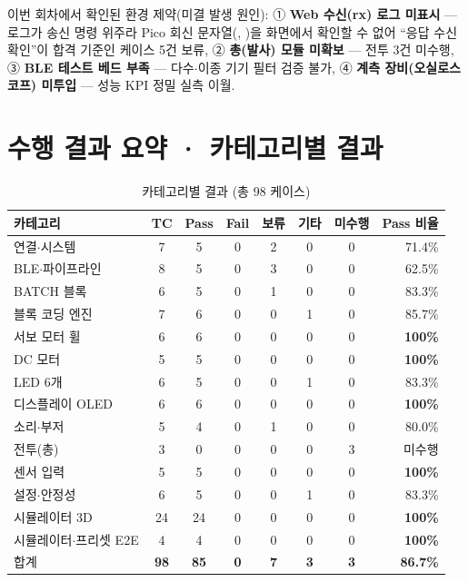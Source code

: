 이번 회차에서 확인된 환경 제약(미결 발생 원인): ① \textbf{Web 수신(rx) 로그 미표시} ---
로그가 송신 명령 위주라 Pico 회신 문자열(, )을 화면에서 확인할 수 없어
``응답 수신 확인''이 합격 기준인 케이스 5건 보류, ② \textbf{총(발사) 모듈 미확보} ---
전투 3건 미수행, ③ \textbf{BLE 테스트 베드 부족} --- 다수$\cdot$이종 기기 필터 검증 불가,
④ \textbf{계측 장비(오실로스코프) 미투입} --- 성능 KPI 정밀 실측 이월.

\section{수행 결과 요약 · 카테고리별 결과}
\begin{table}[htbp]\centering\small
\caption{카테고리별 결과 (총 98 케이스)}
\renewcommand{\arraystretch}{1.18}
\begin{tabularx}{\linewidth}{@{}X c c c c c c r@{}}
\toprule
\sffamily 카테고리 & \sffamily TC & \sffamily Pass & \sffamily Fail & \sffamily 보류 & \sffamily 기타 & \sffamily 미수행 & \sffamily Pass 비율 \\
\midrule
연결$\cdot$시스템        & 7  & 5  & 0 & 2 & 0 & 0 & 71.4\% \\
BLE$\cdot$파이프라인     & 8  & 5  & 0 & 3 & 0 & 0 & 62.5\% \\
BATCH 블록              & 6  & 5  & 0 & 1 & 0 & 0 & 83.3\% \\
블록 코딩 엔진           & 7  & 6  & 0 & 0 & 1 & 0 & 85.7\% \\
서보 모터 휠             & 6  & 6  & 0 & 0 & 0 & 0 & \textbf{100\%} \\
DC 모터                 & 5  & 5  & 0 & 0 & 0 & 0 & \textbf{100\%} \\
LED 6개                 & 6  & 5  & 0 & 0 & 1 & 0 & 83.3\% \\
디스플레이 OLED          & 6  & 6  & 0 & 0 & 0 & 0 & \textbf{100\%} \\
소리$\cdot$부저          & 5  & 4  & 0 & 1 & 0 & 0 & 80.0\% \\
전투(총)                & 3  & 0  & 0 & 0 & 0 & 3 & 미수행 \\
센서 입력               & 5  & 5  & 0 & 0 & 0 & 0 & \textbf{100\%} \\
설정$\cdot$안정성        & 6  & 5  & 0 & 0 & 1 & 0 & 83.3\% \\
시뮬레이터 3D           & 24 & 24 & 0 & 0 & 0 & 0 & \textbf{100\%} \\
시뮬레이터$\cdot$프리셋 E2E & 4 & 4 & 0 & 0 & 0 & 0 & \textbf{100\%} \\
\midrule
\sffamily 합계 & \textbf{98} & \textbf{85} & \textbf{0} & \textbf{7} & \textbf{3} & \textbf{3} & \textbf{86.7\%} \\
\bottomrule
\end{tabularx}
\end{table}

